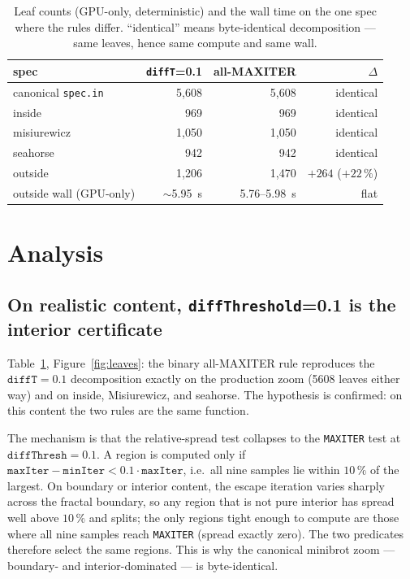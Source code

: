 \documentclass[
	english,
	letterpaper, oneside
]{article}
\begin{document}
\begin{table}[H]
    \centering
    \caption{Leaf counts (GPU-only, deterministic) and the wall time on the one
             spec where the rules differ. ``identical'' means byte-identical
             decomposition --- same leaves, hence same compute and same wall.}
    \label{tab:leaves}
    \begin{tabular}{lrrr}
        \hline
        spec & \texttt{diffT}=0.1 & all-MAXITER & $\Delta$ \\
        \hline
        canonical \texttt{spec.in} & 5{,}608 & 5{,}608 & identical \\
        inside                     & 969     & 969     & identical \\
        misiurewicz                & 1{,}050 & 1{,}050 & identical \\
        seahorse                   & 942     & 942     & identical \\
        outside                    & 1{,}206 & 1{,}470 & $+264$ ($+22\,\%$) \\
        \hline
        outside wall (GPU-only)    & $\sim$5.95~s & 5.76--5.98~s & flat \\
        \hline
    \end{tabular}
\end{table}

\section{Analysis}

\subsection{On realistic content, \texttt{diffThreshold}=0.1 is the
interior certificate}

Table~\ref{tab:leaves}, Figure~\ref{fig:leaves}: the binary all-MAXITER rule
reproduces the $\texttt{diffT}=0.1$ decomposition exactly on the
production zoom (5608 leaves either way) and on inside, Misiurewicz, and seahorse.
The hypothesis is confirmed: on this content the two rules are the same function.

The mechanism is that the relative-spread test collapses to the
\texttt{MAXITER} test at $\texttt{diffThresh}=0.1$. A region is computed only if
$\texttt{maxIter}-\texttt{minIter} < 0.1\cdot\texttt{maxIter}$, i.e.\ all nine
samples lie within $10\,\%$ of the largest. On boundary or interior content, the
escape iteration varies sharply across the fractal boundary, so any region that
is not pure interior has spread well above $10\,\%$ and splits; the only regions
tight enough to compute are those where all nine samples reach \texttt{MAXITER}
(spread exactly zero). The two predicates therefore select the same regions. This
is why the canonical minibrot zoom --- boundary- and interior-dominated --- is
byte-identical.
\end{document}
